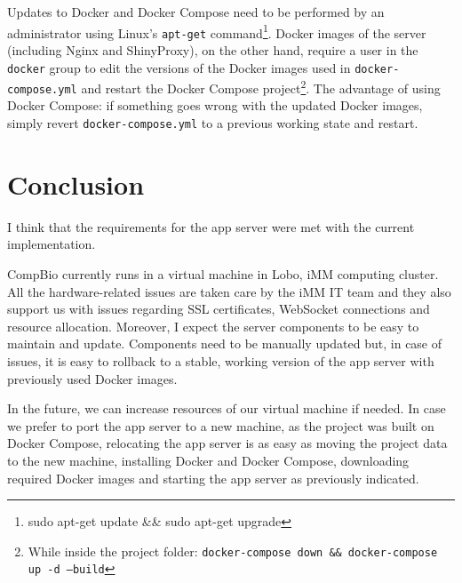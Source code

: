 Updates to Docker and Docker Compose need to be performed by an administrator using Linux's \texttt{apt-get} command\footnote{sudo apt-get update \&\& sudo apt-get upgrade}. Docker images of the server (including Nginx and ShinyProxy), on the other hand, require a user in the \texttt{docker} group to edit the versions of the Docker images used in \texttt{docker-compose.yml} and restart the Docker Compose project\footnote{While inside the project folder: \texttt{docker-compose down \&\& docker-compose up -d --build}}. The advantage of using Docker Compose: if something goes wrong with the updated Docker images, simply revert \texttt{docker-compose.yml} to a previous working state and restart.


\section{Conclusion}

I think that the requirements for the app server were met with the current implementation.

CompBio currently runs in a virtual machine in Lobo, iMM computing cluster. All the hardware-related issues are taken care by the iMM IT team and they also support us with issues regarding SSL certificates, WebSocket connections and resource allocation. Moreover, I expect the server components to be easy to maintain and update. Components need to be manually updated but, in case of issues, it is easy to rollback to a stable, working version of the app server with previously used Docker images.

In the future, we can increase resources of our virtual machine if needed. In case we prefer to port the app server to a new machine, as the project was built on Docker Compose, relocating the app server is as easy as moving the project data to the new machine, installing Docker and Docker Compose, downloading required Docker images and starting the app server as previously indicated.

